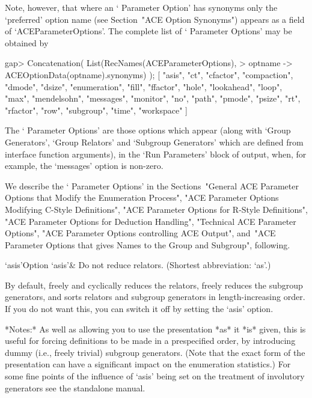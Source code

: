 Note,  however,  that  where  an  \lq{}{\ACE}  Parameter  Option'  has
synonyms only the \lq{}preferred' option name (see Section~"ACE Option
Synonyms") appears as a field of `ACEParameterOptions'.  The  complete
list of \lq{}{\ACE} Parameter Options' may be obtained by

\beginexample
gap> Concatenation( List(RecNames(ACEParameterOptions),                    
>                        optname -> ACEOptionData(optname).synonyms) ); 
[ "asis", "ct", "cfactor", "compaction", "dmode", "dsize", "enumeration", 
  "fill", "ffactor", "hole", "lookahead", "loop", "max", "mendelsohn", 
  "messages", "monitor", "no", "path", "pmode", "psize", "rt", "rfactor", 
  "row", "subgroup", "time", "workspace" ]
\endexample

The \lq{}{\ACE} Parameter Options'  are  those  options  which  appear
(along  with  `Group  Generators',  `Group  Relators'  and   `Subgroup
Generators'  which  are  defined  from   {\ACE}   interface   function
arguments), in the \lq{}Run Parameters' block of {\ACE} output,  when,
for example, the `messages' option is non-zero.

We   describe   the   \lq{}{\ACE}   Parameter    Options'    in    the
Sections~"General ACE Parameter Options that  Modify  the  Enumeration
Process", "ACE Parameter Options Modifying C-Style Definitions",  "ACE
Parameter Options for R-Style Definitions", "ACE Parameter Options for
Deduction Handling", "Technical ACE Parameter Options", "ACE Parameter
Options controlling ACE Output", and~"ACE Parameter Options that gives
Names to the Group and Subgroup", following.


\beginitems

\>`asis'{Option `asis'}&
Do not reduce relators. (Shortest abbreviation: `as'.)

By default, {\ACE} freely  and cyclically reduces the relators, freely
reduces  the  subgroup generators,  and  sorts  relators and  subgroup
generators in length-increasing  order.  If you do not  want this, you
can switch it off by setting the `asis' option.

*Notes:* As well as allowing you  to use the presentation *as* it *is*
given,  this  is  useful for  forcing  definitions  to  be made  in  a
prespecified  order,  by  introducing  dummy  (i.e.,  freely  trivial)
subgroup generators.   (Note that the  exact form of  the presentation
can  have a significant  impact on  the enumeration  statistics.)  For
some fine points of the influence of `asis' being set on the treatment
of involutory generators see the {\ACE} standalone manual.

